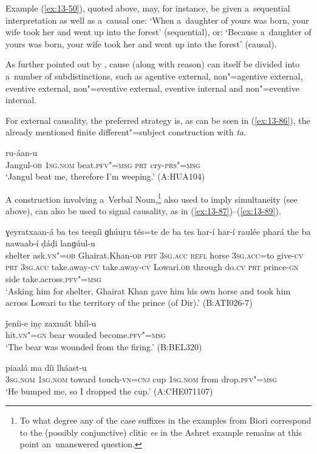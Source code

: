 Example (\ref{ex:13-50}), quoted above, may, for instance, be given a~sequential interpretation as well as a~causal one: `When a~daughter of yours was born, your wife took her and went up into the forest' (sequential), or: `Because a~daughter of yours was born, your wife took her and went up into the forest' (causal).



As further pointed out by \citet[335]{givon2001b}, cause (along with reason) can itself be divided into a~number of subdistinctions, such as agentive external, non"=agentive external, eventive external, non"=eventive external, eventive internal and non"=eventive internal.



For external causality, the preferred strategy is, as can be seen in (\ref{ex:13-86}), the already mentioned finite different"=subject construction with \textit{ta}.

\begin{exe}
\ex
\label{ex:13-86}
 ru-áan-u  \\
Jangul-\textsc{ob} \textsc{1sg.nom} beat.\textsc{pfv"=msg} \textsc{prt} cry-\textsc{prs"=msg}  \\
\glt `Jangul beat me, therefore I'm weeping.' (A:HUA104)
\end{exe}

A construction involving a~Verbal Noun,\footnote{To what degree any of the case suffixes in the examples from Biori correspond to the (possibly conjunctive) clitic \textit{ee} in the Ashret example remains at this point an~unanswered question.} also used to imply simultaneity (see above), can also be used to signal causality, as in (\ref{ex:13-87})--(\ref{ex:13-89}).

\begin{exe}
\ex
\label{ex:13-87}
 ɣeyratxaan-á ba tes teeṇíi ɡhúuṛu tés=te de ba tes har-í har-í raulée phará the ba nawaab-í ḍáḍi lanɡúul-u \\
shelter ask.\textsc{vn"=ob} Ghairat.Khan-\textsc{ob} \textsc{prt} \textsc{3sg.acc} \textsc{refl}  horse \textsc{3sg.acc}=to give-\textsc{cv} \textsc{prt} \textsc{3sg.acc} take.away-\textsc{cv} take.away-\textsc{cv} Lowari.\textsc{ob} through do.\textsc{cv} \textsc{prt} prince-\textsc{gn} side take.across.\textsc{pfv"=msg} \\
\glt `Asking him for shelter, Ghairat Khan gave him his own horse and took him across Lowari to the territory of the prince (of Dir).' (B:ATI026-7)

\ex
\label{ex:13-88}
\gll ǰeníi-e iṇc̣ zaxmát bhíl-u \\
hit.\textsc{vn"=gn} bear wouded become.\textsc{pfv"=msg} \\
\glt `The bear was wounded from the firing.' (B:BEL320)

\ex
\label{ex:13-89}
\gll [so ma pharé ḍhak"=ainíi=ee] piaalá ma díi lháast-u \\
\textsc{3sg.nom} \textsc{1sg.nom} toward touch-\textsc{vn=cnj} cup \textsc{1sg.nom} from drop.\textsc{pfv"=msg}  \\
\glt `He bumped me, so I dropped the cup.' (A:CHE071107) 
\end{exe}

